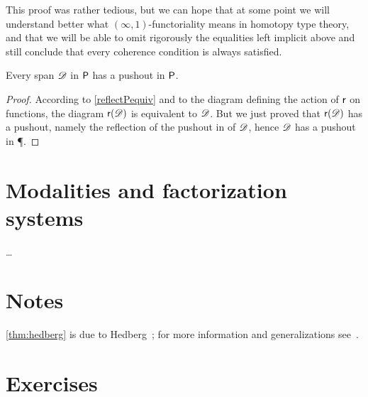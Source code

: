 This proof was rather tedious, but we can hope that at some point we will
understand better what $(\infty,1)$-functoriality means in homotopy type theory, and
that we will be able to omit rigorously the equalities left implicit above and still
conclude that every coherence condition is always satisfied.

\begin{cor}
  Every span $\Ddiag$ in $\P$ has a pushout in $\P$.
\end{cor}

\begin{proof}
  According to \autoref{reflectPequiv} and to the diagram defining the action of
  $\reflect$ on functions, the diagram $\reflect(\Ddiag)$ is equivalent to
  $\Ddiag$. But we just proved that $\reflect(\Ddiag)$ has a pushout, namely the
  reflection of the pushout in \type of $\Ddiag$, hence $\Ddiag$ has a pushout
  in \P.
\end{proof}

\section{Modalities and factorization systems}
\label{sec:modalities}

\dots

\section*{Notes}

\autoref{thm:hedberg} is due to Hedberg~\cite{hedberg1998coherence}; for more information and generalizations see~\cite{krausgeneralizations}.

\section*{Exercises}



